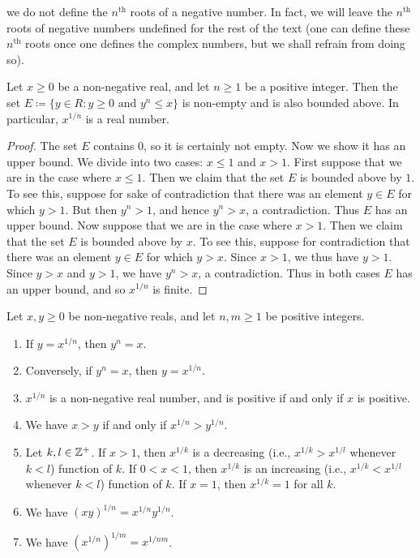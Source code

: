 \begin{note}
  we do not define the \(n^{\text{th}}\) roots of a negative number.
  In fact, we will leave the \(n^{\text{th}}\) roots of negative numbers undefined for the rest of the text
  (one can define these \(n^{\text{th}}\) roots once one defines the complex numbers, but we shall refrain from doing so).
\end{note}

\begin{lem}\label{5.6.5}
  Let \(x \geq 0\) be a non-negative real, and let \(n \geq 1\) be a positive integer.
  Then the set \(E \coloneqq \{y \in R : y \geq 0 \text{ and } y^n \leq x\}\) is non-empty and is also bounded above.
  In particular, \(x^{1 / n}\) is a real number.
\end{lem}

\begin{proof}
  The set \(E\) contains \(0\), so it is certainly not empty.
  Now we show it has an upper bound.
  We divide into two cases: \(x \leq 1\) and \(x > 1\).
  First suppose that we are in the case where \(x \leq 1\).
  Then we claim that the set \(E\) is bounded above by \(1\).
  To see this, suppose for sake of contradiction that there was an element \(y \in E\) for which \(y > 1\).
  But then \(y^n > 1\), and hence \(y^n > x\), a contradiction.
  Thus \(E\) has an upper bound.
  Now suppose that we are in the case where \(x > 1\).
  Then we claim that the set \(E\) is bounded above by \(x\).
  To see this, suppose for contradiction that there was an element \(y \in E\) for which \(y > x\).
  Since \(x > 1\), we thus have \(y > 1\).
  Since \(y > x\) and \(y > 1\), we have \(y^n > x\), a contradiction.
  Thus in both cases \(E\) has an upper bound, and so \(x^{1 / n}\) is finite.
\end{proof}

\begin{lem}\label{5.6.6}
  Let \(x, y \geq 0\) be non-negative reals, and let \(n, m \geq 1\) be positive integers.
  \begin{enumerate}
    \item If \(y = x^{1 / n}\), then \(y^n = x\).
    \item Conversely, if \(y^n = x\), then \(y = x^{1 / n}\).
    \item \(x^{1 / n}\) is a non-negative real number, and is positive if and only if \(x\) is positive.
    \item We have \(x > y\) if and only if \(x^{1 / n} > y^{1 / n}\).
    \item Let \(k, l \in \mathbb{Z}^+\).
          If \(x > 1\), then \(x^{1 / k}\) is a decreasing (i.e., \(x^{1 / k} > x^{1 / l}\) whenever \(k < l\)) function of \(k\).
          If \(0 < x < 1\), then \(x^{1 / k}\) is an increasing (i.e., \(x^{1 / k} < x^{1 / l}\) whenever \(k < l\)) function of \(k\).
          If \(x = 1\), then \(x^{1 / k} = 1\) for all \(k\).
    \item We have \((xy)^{1 / n} = x^{1 / n} y^{1 / n}\).
    \item We have \((x^{1 / n})^{1 / m} = x^{1 / nm}\).
  \end{enumerate}
\end{lem}

